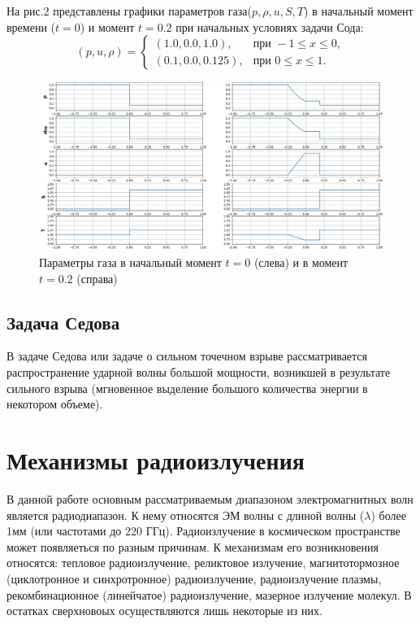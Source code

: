 \documentclass[a4paper,12pt]{extarticle}
\begin{document}
На рис.2 представлены графики параметров газа($p,\rho,u, S, T$) в начальный момент времени ($t=0$) и момент $t=0.2$ при начальных условиях задачи Сода: 
\begin{equation}
        (p, u, \rho) =
        \begin{cases}
            (1.0, 0.0, 1.0), & \text{при } -1\leq x\leq0,\\
            (0.1, 0.0, 0.125), & \text{при } 0\leq x\leq1.
        \end{cases}
\end{equation}
\clearpage
\begin{figure}[!htb]
	\centering
	\includegraphics[width=1\textwidth]{2 time moments (no time).png}
	\caption{
		Параметры газа в начальный момент $t=0$ (слева) и в момент $t=0.2$ (справа)
	}
	\label{fig:time_moments}
\end{figure}
\subsection{Задача Седова}
В задаче Седова или задаче о сильном точечном взрыве рассматривается распространение ударной волны большой мощности, возникшей в результате сильного взрыва (мгновенное выделение большого количества энергии в некотором объеме).
\section{Механизмы радиоизлучения} \label{sec: Radio emission}
В данной работе основным рассматриваемым диапазоном электромагнитных волн является радиодиапазон.
К нему относятся ЭМ волны с длиной волны ($\lambda$) более 1мм (или частотами до 220 ГГц).
Радиоизлучение в космическом пространстве может появляеться по разным причинам.
К механизмам его возникновения относятся: тепловое радиоизлучение, реликтовое излучение, магнитотормозное (циклотронное и синхротронное) радиоизлучение, радиоизлучение плазмы, рекомбинационное (линейчатое) радиоизлучение, мазерное излучение молекул. 
В остатках сверхновоых осуществляются лишь некоторые из них. \cite{Kaplan1966}
\end{document}
